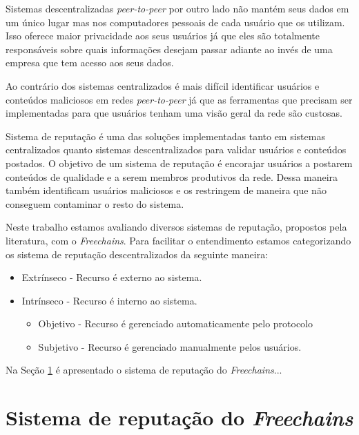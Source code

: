\documentclass[12pt]{article}
\newcommand{\FC} {\emph{Freechains}\xspace}
\newcommand{\PtoP} {\emph{peer-to-peer}\xspace}
\begin{document}
Sistemas descentralizadas \PtoP por outro lado não mantém seus dados em um único lugar mas nos computadores pessoais de cada usuário que os utilizam. Isso oferece maior privacidade aos seus usuários já que eles são totalmente responsáveis sobre quais informações desejam passar adiante ao invés de uma empresa que tem acesso aos seus dados.

Ao contrário dos sistemas centralizados é mais difícil identificar usuários e conteúdos maliciosos em redes \PtoP já que as ferramentas que precisam ser implementadas para que usuários tenham uma visão geral da rede são custosas. 

Sistema de reputação é uma das soluções implementadas tanto em sistemas centralizados quanto sistemas descentralizados para validar usuários e conteúdos postados. O objetivo de um sistema de reputação é encorajar usuários a postarem conteúdos de qualidade e a serem membros produtivos da rede. Dessa maneira também identificam usuários maliciosos e os restringem de maneira que não conseguem contaminar o resto do sistema.

Neste trabalho estamos avaliando diversos sistemas de reputação, propostos pela literatura, com o \FC. Para facilitar o entendimento estamos categorizando os sistema de reputação descentralizados da seguinte maneira:

\begin{itemize}
    \item Extrínseco - Recurso é externo ao sistema.
    \item Intrínseco - Recurso é interno ao sistema.
    \begin{itemize}
        \item Objetivo - Recurso é gerenciado automaticamente pelo protocolo
        \item Subjetivo - Recurso é gerenciado manualmente pelos usuários.
    \end{itemize}
\end{itemize}

Na Seção \ref{sec:freechains} é apresentado o sistema de reputação do \FC...

\section{Sistema de reputação do \FC} \label{sec:freechains}
\end{document}
